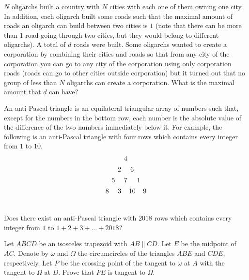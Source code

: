 \documentclass[11pt]{scrartcl}
\begin{document}
\begin{problem}[4439711278400170990]
	$N$ oligarchs built a country with $N$ cities with each one of them owning one city. In addition, each oligarch built some roads such that the maximal amount of roads an oligarch can build between two cities is $1$ (note that there can be more than $1$ road going through two cities, but they would belong to different oligarchs).
A total of $d$ roads were built. Some oligarchs wanted to create a corporation by combining their cities and roads so that from any city of the corporation you can go to any city of the corporation using only corporation roads (roads can go to other cities outside corporation) but it turned out that no group of less than $N$ oligarchs can create a corporation. What is the maximal amount that $d$ can have?
\end{problem}
\begin{problem}[7494618588207758150]
	An anti-Pascal triangle is an equilateral triangular array of numbers such that, except for the numbers in the bottom row, each number is the absolute value of the difference of the two numbers immediately below it. For example, the following is an anti-Pascal triangle with four rows which contains every integer from $1$ to $10$.
\[\begin{array}{
c@{\hspace{4pt}}c@{\hspace{4pt}}
c@{\hspace{4pt}}c@{\hspace{2pt}}c@{\hspace{2pt}}c@{\hspace{4pt}}c
} \vspace{4pt}
 & & & 4 & & &  \\\vspace{4pt}
 & & 2 & & 6 & &  \\\vspace{4pt}
 & 5 & & 7 & & 1 & \\\vspace{4pt}
 8 & & 3 & & 10 & & 9 \\\vspace{4pt}
\end{array}\]Does there exist an anti-Pascal triangle with $2018$ rows which contains every integer from $1$ to $1 + 2 + 3 + \dots + 2018$?

\end{problem}
\begin{problem}[551619066390682]
Let $ABCD$ be an isosceles trapezoid with $AB\parallel CD$. Let $E$ be the midpoint of $AC$. Denote by $\omega$ and $\Omega$ the circumcircles of the triangles $ABE$ and $CDE$, respectively. Let $P$ be the crossing point of the tangent to $\omega$ at $A$ with the tangent to $\Omega$ at $D$. Prove that $PE$ is tangent to $\Omega$.
\end{problem}
\end{document}
